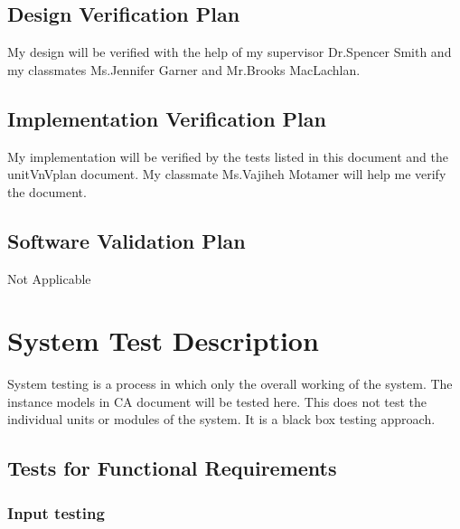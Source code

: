 \documentclass[12pt, titlepage]{article}
\begin{document}
\subsection{Design Verification Plan}

My design will be verified with the help of my supervisor Dr.Spencer Smith and my classmates Ms.Jennifer Garner and Mr.Brooks MacLachlan.

\subsection{Implementation Verification Plan}


My implementation will be verified by the tests listed in this document and the unitVnVplan document. My classmate Ms.Vajiheh Motamer will help me verify the document.	

\subsection{Software Validation Plan}

Not Applicable

\section{System Test Description}

System testing is a process in which only the overall working of the system. The instance models in CA document will be tested here. This does not test the individual units or modules of the system. It is a black box testing approach.
	
\subsection{Tests for Functional Requirements}

\subsubsection{Input testing}
\end{document}
